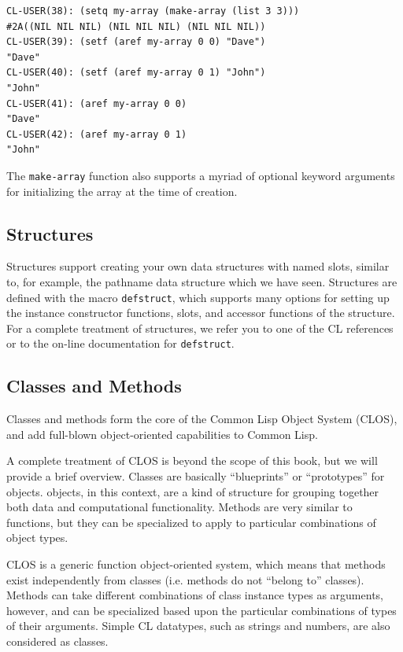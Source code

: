 \begin{verbatim}
CL-USER(38): (setq my-array (make-array (list 3 3)))
#2A((NIL NIL NIL) (NIL NIL NIL) (NIL NIL NIL))
CL-USER(39): (setf (aref my-array 0 0) "Dave")
"Dave"
CL-USER(40): (setf (aref my-array 0 1) "John")
"John"
CL-USER(41): (aref my-array 0 0)
"Dave"
CL-USER(42): (aref my-array 0 1)
"John"
\end{verbatim}

The \texttt{make-array} function also supports a myriad of optional keyword arguments for initializing the array at the time of creation.

\subsection{Structures}

Structures support creating your own data structures with named slots, similar to, for example, the pathname data structure which we have seen. Structures are defined with the macro
\texttt{defstruct}, which supports many options for setting up the instance constructor functions,
slots, and accessor functions of the structure. For a complete treatment of structures, we
refer you to one of the CL references or to the on-line documentation for \texttt{defstruct}.

\subsection{Classes and Methods}

Classes and methods form the core of the Common Lisp Object System (CLOS), and add
full-blown object-oriented capabilities to Common Lisp.

A complete treatment of CLOS is beyond the scope of this book, but we will provide
a brief overview. Classes are basically ``blueprints'' or ``prototypes'' for objects. objects,
in this context, are a kind of structure for grouping together both data and computational
functionality. Methods are very similar to functions, but they can be specialized to apply
to particular combinations of object types.

CLOS is a generic function object-oriented system, which means that methods exist
independently from classes (i.e. methods do not ``belong to'' classes). Methods can take
different combinations of class instance types as arguments, however, and can be specialized
based upon the particular combinations of types of their arguments. Simple CL datatypes,
such as strings and numbers, are also considered as classes.

